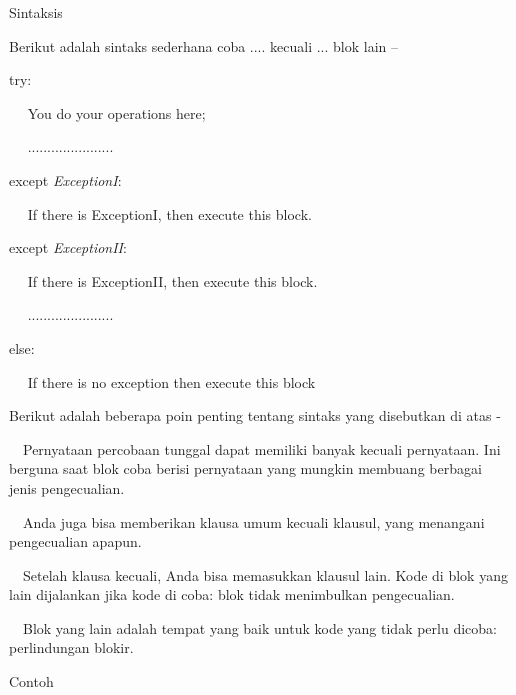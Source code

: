 \documentclass[a4paper,12pt]{report}
\begin{document}
\noindent 
Sintaksis \par
\vspace{12pt}
\noindent 
Berikut adalah sintaks sederhana coba .... kecuali ... blok lain – \par
\vspace{12pt}
\noindent 
try: \par
\noindent 
~~ You do your operations here; \par
\noindent 
~~ ...................... \par
\noindent 
except \textit{ExceptionI}: \par
\noindent 
~~ If there is ExceptionI, then execute this block. \par
\noindent 
except \textit{ExceptionII}: \par
\noindent 
~~ If there is ExceptionII, then execute this block. \par
\noindent 
~~ ...................... \par
\noindent 
else: \par
\noindent 
~~ If there is no exception then execute this block \par
\vspace{12pt}
\vspace{12pt}
\noindent 
Berikut adalah beberapa poin penting tentang sintaks yang disebutkan di atas - \par
\vspace{12pt}
\noindent 
 $  $ $  $ $  $ $  $Pernyataan percobaan tunggal dapat memiliki banyak kecuali pernyataan. Ini berguna saat blok coba berisi pernyataan yang mungkin membuang berbagai jenis pengecualian. \par
\vspace{12pt}
\noindent 
 $  $ $  $ $  $ $  $Anda juga bisa memberikan klausa umum kecuali klausul, yang menangani pengecualian apapun. \par
\vspace{12pt}
\noindent 
 $  $ $  $ $  $ $  $Setelah klausa kecuali, Anda bisa memasukkan klausul lain. Kode di blok yang lain dijalankan jika kode di coba: blok tidak menimbulkan pengecualian. \par
\vspace{12pt}
\noindent 
 $  $ $  $ $  $ $  $Blok yang lain adalah tempat yang baik untuk kode yang tidak perlu dicoba: perlindungan blokir. \par
\vspace{12pt}
\noindent 
Contoh \par
\vspace{12pt}
\end{document}
